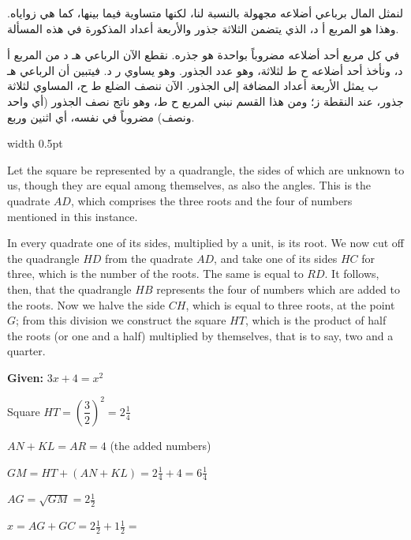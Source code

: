 \documentclass[10pt,a4paper]{book}
\newlength{\colwidth}
\newcommand{\bilingualpair}[2]{%
  \noindent
  \begin{minipage}[t]{\colwidth}
  \begin{flushright}
  \vspace{0pt}
  {\arabicfont\small #1}
  \end{flushright}
  \end{minipage}%
  \hfill\textcolor{columnsepclr}{\vrule width 0.5pt}\hfill
  \begin{minipage}[t]{\colwidth}
  \vspace{0pt}
  {\small #2}
  \end{minipage}%
  \par\vspace{0.6em}
}
\begin{document}
\bilingualpair{
لنمثل المال برباعي أضلاعه مجهولة بالنسبة لنا، لكنها متساوية
فيما بينها، كما هي زواياه. وهذا هو المربع أ د، الذي يتضمن
الثلاثة جذور والأربعة أعداد المذكورة في هذه المسألة.

في كل مربع أحد أضلاعه مضروباً بواحدة هو جذره. نقطع الآن
الرباعي هـ د من المربع أ د، ونأخذ أحد أضلاعه ح ط
لثلاثة، وهو عدد الجذور. وهو يساوي ر د. فيتبين أن
الرباعي هـ ب يمثل الأربعة أعداد المضافة إلى الجذور. الآن
ننصف الضلع ط ح، المساوي لثلاثة جذور، عند النقطة ز؛ ومن
هذا القسم نبني المربع ح ط، وهو ناتج نصف الجذور (أي واحد
ونصف) مضروباً في نفسه، أي اثنين وربع.
}{
Let the square be represented by a quadrangle, the sides of which are unknown
to us, though they are equal among themselves, as also the angles. This is the
quadrate $AD$, which comprises the three roots and the four of numbers
mentioned in this instance.

In every quadrate one of its sides, multiplied by a unit, is its root. We now
cut off the quadrangle $HD$ from the quadrate $AD$, and take one of its sides
$HC$ for three, which is the number of the roots. The same is equal to $RD$.
It follows, then, that the quadrangle $HB$ represents the four of numbers
which are added to the roots. Now we halve the side $CH$, which is equal to
three roots, at the point $G$; from this division we construct the square
$HT$, which is the product of half the roots (or one and a half) multiplied
by themselves, that is to say, two and a quarter.
}

\vspace{0.5em}
\begin{mathbox}[title={\textbf{Geometric Proof of Case VI}}]
\begin{center}
\textbf{Given:} $3x + 4 = x^2$

\vspace{0.3cm}

Square $HT = \left(\dfrac{3}{2}\right)^2 = 2\tfrac{1}{4}$

$AN + KL = AR = 4$ (the added numbers)

$GM = HT + (AN + KL) = 2\tfrac{1}{4} + 4 = 6\tfrac{1}{4}$

$AG = \sqrt{GM} = 2\tfrac{1}{2}$

$x = AG + GC = 2\tfrac{1}{2} + 1\tfrac{1}{2} =$ 
\end{center}
\end{mathbox}
\vspace{0.5em}

\newpage


\end{document}
